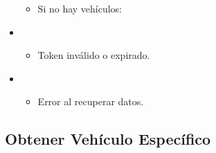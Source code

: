 \documentclass[a4paper,11pt,spanish]{sphinxmanual}
\begin{document}
\begin{fulllineitems}
\begin{itemize}
\begin{itemize}
\item {} 
\sphinxAtStartPar
Si no hay vehículos:

\begin{sphinxVerbatim}[commandchars=\\\{\}]
\end{sphinxVerbatim}

\end{itemize}

\item {} 
\sphinxAtStartPar
{}
\begin{itemize}
\item {} 
\sphinxAtStartPar
Token inválido o expirado.

\end{itemize}

\item {} 
\sphinxAtStartPar
{}
\begin{itemize}
\item {} 
\sphinxAtStartPar
Error al recuperar datos.

\end{itemize}

\end{itemize}

\end{fulllineitems}



\subsection{Obtener Vehículo Específico}
\label{\detokenize{endpoints:obtener-vehiculo-especifico}}
\end{document}
